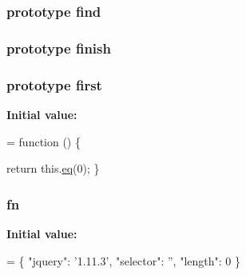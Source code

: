 \subsubsection[{\texorpdfstring{find}{find}}]{ {\bf prototype} find}\hypertarget{jquery-2_82_81-vsdoc_8js_a7fc0ed1bd74e970d443775bdab4706f4}{}\label{jquery-2_82_81-vsdoc_8js_a7fc0ed1bd74e970d443775bdab4706f4}
\subsubsection[{\texorpdfstring{finish}{finish}}]{ {\bf prototype} finish}\hypertarget{jquery-2_82_81-vsdoc_8js_a8a08d47f51f8dd32803538f46edb3e92}{}\label{jquery-2_82_81-vsdoc_8js_a8a08d47f51f8dd32803538f46edb3e92}
\subsubsection[{\texorpdfstring{first}{first}}]{ {\bf prototype} first}\hypertarget{jquery-2_82_81-vsdoc_8js_a436adcac6bdff190fbce85670078e885}{}\label{jquery-2_82_81-vsdoc_8js_a436adcac6bdff190fbce85670078e885}
{\bfseries Initial value\+:}
\begin{DoxyCode}
= \textcolor{keyword}{function} () \{
        

        \textcolor{keywordflow}{return} this.\hyperlink{jquery-2_82_81-vsdoc_8js_a57adf3cfa88f689534e187b77491d52d}{eq}(0);
    \}
\end{DoxyCode}
\subsubsection[{\texorpdfstring{fn}{fn}}]{ fn}\hypertarget{jquery-2_82_81-vsdoc_8js_acef6bdaf6b9b20fdcca1ea86f0902c3b}{}\label{jquery-2_82_81-vsdoc_8js_acef6bdaf6b9b20fdcca1ea86f0902c3b}
{\bfseries Initial value\+:}
\begin{DoxyCode}
= \{
        \textcolor{stringliteral}{"jquery"}: \textcolor{stringliteral}{'1.11.3'},
        \textcolor{stringliteral}{"selector"}: \textcolor{stringliteral}{''},
        \textcolor{stringliteral}{"length"}: 0
    \}
\end{DoxyCode}
